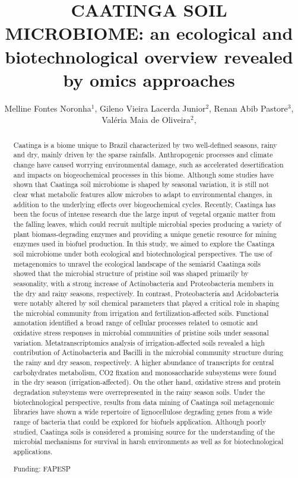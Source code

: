 \documentclass[twoside]{article}
\title{\vspace{-15mm}\fontsize{24pt}{10pt}\selectfont\textbf{ CAATINGA SOIL MICROBIOME: an ecological and biotechnological overview revealed by omics approaches }} %
\author{ Melline Fontes Noronha$^{1}$, Gileno Vieira Lacerda Junior$^{2}$, Renan Abib Pastore$^{3}$, Valéria Maia de Oliveira$^{2}$, }
\affil{ 1 Centro Pluridisciplinar de Pesquisas Químicas Biológicas e Agrícolas , Universidade Estadual de Campinas 

2 Microbial Resources Division, Research Center for Chemistry, Biology and Agriculture, University of Campinas

3  Microbial Resources Division, Research Center for Chemistry, Biology and Agriculture, University of Campinas

 }
\date{}
\begin{document}
  
  
  \maketitle %
  
  
  \thispagestyle{fancy} %
  
  
  \begin{abstract}
  Caatinga is a biome unique to Brazil characterized by two well-defined seasons, rainy and dry, mainly driven by the sparse rainfalls. Anthropogenic processes and climate change have caused worrying environmental damage, such as accelerated desertification and impacts on biogeochemical processes in this biome. Although some studies have shown that Caatinga soil microbiome is shaped by seasonal variation, it is still not clear what metabolic features allow microbes to adapt to environmental changes, in addition to the underlying effects over biogeochemical cycles. Recently, Caatinga has been the focus of intense research due the large input of vegetal organic matter from the falling leaves, which could recruit multiple microbial species producing a variety of plant biomass-degrading enzymes and providing a unique genetic resource for mining enzymes used in biofuel production. In this study, we aimed to explore the Caatinga soil microbiome under both ecological and biotechnological perspectives. The use of metagenomics to unravel the ecological landscape of the semiarid Caatinga soils showed that the microbial structure of pristine soil was shaped primarily by seasonality, with a strong increase of Actinobacteria and Proteobacteria members in the dry and rainy seasons, respectively. In contrast, Proteobacteria and Acidobacteria were notably altered by soil chemical parameters that played a critical role in shaping the microbial community from irrigation and fertilization-affected soils. Functional annotation identified a broad range of cellular processes related to osmotic and oxidative stress responses in microbial communities of pristine soils under seasonal variation. Metatranscriptomics analysis of irrigation-affected soils revealed a high contribution of Actinobacteria and Bacilli in the microbial community structure during the rainy and dry season, respectively. A higher abundance of transcripts for central carbohydrates metabolism, CO2 fixation and monosaccharide subsystems were found in the dry season (irrigation-affected). On the other hand, oxidative stress and protein degradation subsystems were overrepresented in the rainy season soils. Under the biotechnological perspective, results from data mining of Caatinga soil metagenomic libraries have shown a wide repertoire of lignocellulose degrading genes from a wide range of bacteria that could be explored for biofuels application.  Although poorly studied, Caatinga soils is considered a promising source for the understanding of the microbial mechanisms for survival in harsh environments as well as for biotechnological applications.
  
  Funding: FAPESP \\ 
  \end{abstract}
  
\end{document}
